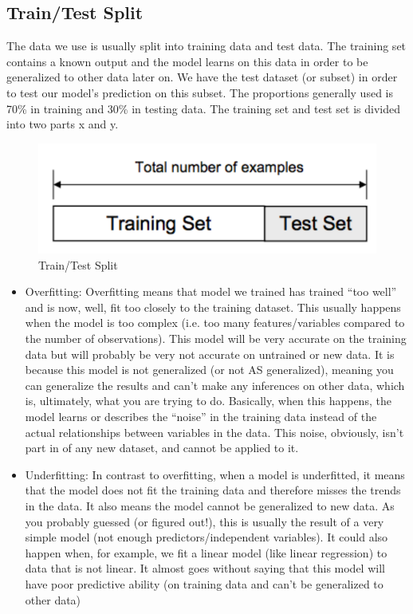     \subsection{Train/Test Split}
    The data we use is usually split into training data and test data. The training set contains a known output and the model learns on this data in order to be generalized to other data later on. We have the test dataset (or subset) in order to test our model’s prediction on this subset. The proportions generally used is 70\% in training and 30\% in testing data.  The training set and test set is divided into two parts x and y.

      \begin{figure}[h!]
        \centering
         \includegraphics[scale=0.3]{Figures/split.png}
        \caption{Train/Test Split}
      \end{figure}
      
      \begin{itemize}
          \item Overfitting: 
          Overfitting means that model we trained has trained “too well” and is now, well, fit too closely to the training dataset. This usually happens when the model is too complex (i.e. too many features/variables compared to the number of observations). This model will be very accurate on the training data but will probably be very not accurate on untrained or new data. It is because this model is not generalized (or not AS generalized), meaning you can generalize the results and can’t make any inferences on other data, which is, ultimately, what you are trying to do. Basically, when this happens, the model learns or describes the “noise” in the training data instead of the actual relationships between variables in the data. This noise, obviously, isn’t part in of any new dataset, and cannot be applied to it.
          
          \item Underfitting: 
          In contrast to overfitting, when a model is underfitted, it means that the model does not fit the training data and therefore misses the trends in the data. It also means the model cannot be generalized to new data. As you probably guessed (or figured out!), this is usually the result of a very simple model (not enough predictors/independent variables). It could also happen when, for example, we fit a linear model (like linear regression) to data that is not linear. It almost goes without saying that this model will have poor predictive ability (on training data and can’t be generalized to other data)
      \end{itemize}
      
